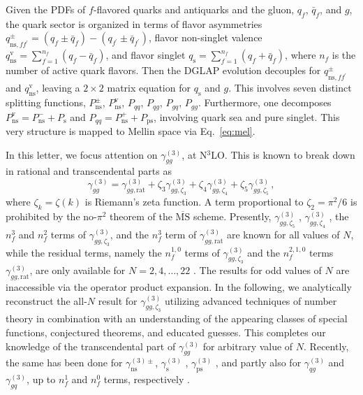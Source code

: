 \documentclass[
 twocolumn,
 superscriptaddress,
 preprintnumbers,
 nofootinbib,
 amsmath,amssymb,
 aps,
 prl
 ]{revtex4-2}
\begin{document}
Given the PDFs of $f$-flavored quarks and antiquarks and the gluon, $q_f$, $\bar{q}_f$, and $g$, the quark sector is organized in terms of flavor asymmetries $q_{\mathrm{ns},ff^\prime}^{\pm}=(q_f\pm \bar{q}_f)-(q_{f^\prime}\pm \bar{q}_{f^\prime})$, flavor non-singlet valence $q_{\mathrm{ns}}^{\mathrm{v}}=\sum_{f=1}^{n_f}(q_f-\bar{q}_f)$, and flavor singlet $q_{\mathrm{s}}=\sum_{f=1}^{n_f}(q_f+\bar{q}_f)$, where $n_f$ is the number of active quark flavors.
Then the DGLAP evolution decouples for $q_{\mathrm{ns},ff^\prime}^{\pm}$ and $q_{\mathrm{ns}}^{\mathrm{v}}$, leaving a $2\times2$ matrix equation for $q_{\mathrm{s}}$ and $g$.
This involves seven distinct splitting functions, $P_{\mathrm{ns}}^{\pm}$, $P_{\mathrm{ns}}^{\mathrm{v}}$, $P_{qq}$, $P_{qg}$, $P_{gq}$, $P_{gg}$.
Furthermore, one decomposes $P_{\mathrm{ns}}^{\mathrm{v}}=P_{\mathrm{ns}}^-+P_{\mathrm{s}}$ and $P_{qq}=P_{\mathrm{ns}}^++P_{\mathrm{ps}}$, involving quark sea and pure singlet.
This very structure is mapped to Mellin space via Eq.~\eqref{eq:mel}.

In this letter, we focus attention on $\gamma_{gg}^{(3)}$, at N$^3$LO.
This is known to break down in rational and transcendental parts as \cite{Moch:2021qrk,Moch:2023tdj,Falcioni:2024qpd,Falcioni:2025hfz}
\begin{equation}
\gamma_{gg}^{(3)}=
\gamma_{gg,\mathrm{rat}}^{(3)}
+\zeta_3\gamma_{gg,\zeta_3}^{(3)}
+\zeta_4\gamma_{gg,\zeta_4}^{(3)}
+\zeta_5\gamma_{gg,\zeta_5}^{(3)}\,,
\label{eq:zeta3}
\end{equation}
where $\zeta_k=\zeta(k)$ is Riemann's zeta function.
A term proportional to $\zeta_2=\pi^2/6$ is prohibited by the no-$\pi^2$ theorem \cite{Davies:2017hyl,Jamin:2017mul,Baikov:2018wgs} of the $\overline{\mathrm{MS}}$ scheme.
Presently, $\gamma_{gg,\zeta_5}^{(3)}$ \cite{Moch:2018wjh,Falcioni:2024qpd}, $\gamma_{gg,\zeta_4}^{(3)}$ \cite{Davies:2017hyl}, the $n_f^3$ \cite{Davies:2016jie} and $n_f^2$ \cite{Falcioni:2024qpd} terms of $\gamma_{gg,\zeta_3}^{(3)}$, and the $n_f^3$ term of $\gamma_{gg,\mathrm{rat}}^{(3)}$ \cite{Davies:2016jie} are known for all values of $N$, while the residual terms, namely the $n_f^{1,0}$ terms of $\gamma_{gg,\zeta_3}^{(3)}$ and the $n_f^{2,1,0}$ terms $\gamma_{gg,\mathrm{rat}}^{(3)}$, are only available for $N=2,4,\ldots,22$ \cite{Moch:2021qrk
,Moch:2023tdj
,Falcioni:2024qpd
,Falcioni:2025hfz
}.
The results for odd values of $N$ are inaccessible via the operator product expansion.
In the following, we analytically reconstruct the all-$N$ result for $\gamma_{gg,\zeta_3}^{(3)}$ utilizing advanced techniques of number theory in combination with an understanding of the appearing classes of special functions, conjectured theorems, and educated guesses.
This completes our knowledge of the transcendental part of $\gamma_{gg}^{(3)}$ for arbitrary value of $N$.
Recently, the same has been done for $\gamma_{\mathrm{ns}}^{(3)\pm}$, $\gamma_{\mathrm{s}}^{(3)}$ \cite{Kniehl:2025jfs,Kniehl:2026axe,Gehrmann:2026qbl}, $\gamma_{\mathrm{ps}}^{(3)}$ \cite{Falcioni:2025hfz}, and partly also for $\gamma_{qg}^{(3)}$ and $\gamma_{gq}^{(3)}$, up to $n_f^1$ and $n_f^0$ terms, respectively \cite{Falcioni:2025hfz}.
\end{document}
